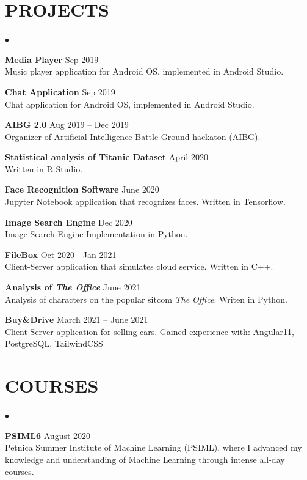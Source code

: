 \documentclass[margin,center]{res}
\newenvironment{list2}{
  \begin{list}{$\bullet$}{%
      \setlength{\itemsep}{0in}
      \setlength{\parsep}{0in} \setlength{\parskip}{0in}
      \setlength{\topsep}{0in} \setlength{\partopsep}{0in}
      \setlength{\leftmargin}{0.2in}}}{\end{list}}
\begin{document}
\begin{resume}
\section{PROJECTS\\}
\begin{list2}
  \item{\bf Media Player} \hfill  Sep 2019\\
    Music player application for Android OS, implemented in Android Studio.
  \item{\bf Chat Application} \hfill Sep 2019\\
    Chat application for Android OS, implemented in Android Studio.
  \item{\bf AIBG 2.0} \hfill Aug 2019 -- Dec 2019 \\ 
    Organizer of Artificial Intelligence Battle Ground hackaton (AIBG).
  \item{\bf Statistical analysis of Titanic Dataset} \hfill April 2020\\
    Written in R Studio.  
  \item{\bf Face Recognition Software} \hfill June 2020\\
    Jupyter Notebook application that recognizes faces. Written in Tensorflow.
  \item{\bf Image Search Engine} \hfill Dec 2020 \\
    Image Search Engine Implementation in Python.
  \item{\bf FileBox}  \hfill Oct 2020 - Jan 2021\\
    Client-Server application that simulates cloud service. Written in C++.
  \item{\bf Analysis of \emph{The Office}} \hfill June 2021 \\
    Analysis of characters on the popular sitcom \emph{The Office}. Writen in Python.
  \item{\bf Buy\&Drive} \hfill March 2021 -- June 2021 \\
    Client-Server application for selling cars. Gained experience with: Angular11, PostgreSQL, TailwindCSS

\end{list2}

\section{COURSES}
\begin{list2}
  \item {\bf PSIML6} \hfill August 2020\\
    Petnica Summer Institute of Machine Learning (PSIML), where I
    advanced my knowledge and understanding of Machine Learning
    through intense all-day courses.


\end{list2}
\end{resume}
\end{document}
